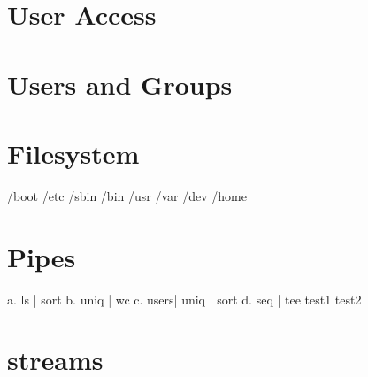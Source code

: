 \documentclass[a4paper,11pt,twoside]{article}
\begin{document}
\section{User Access}

\section{Users and Groups}


\section{Filesystem}
/boot
/etc
/sbin
/bin
/usr
/var
/dev
/home

\section{Pipes}
a. ls | sort
b. uniq | wc
c. users| uniq | sort
d. seq | tee test1 test2

\section{streams}



\end{document}
